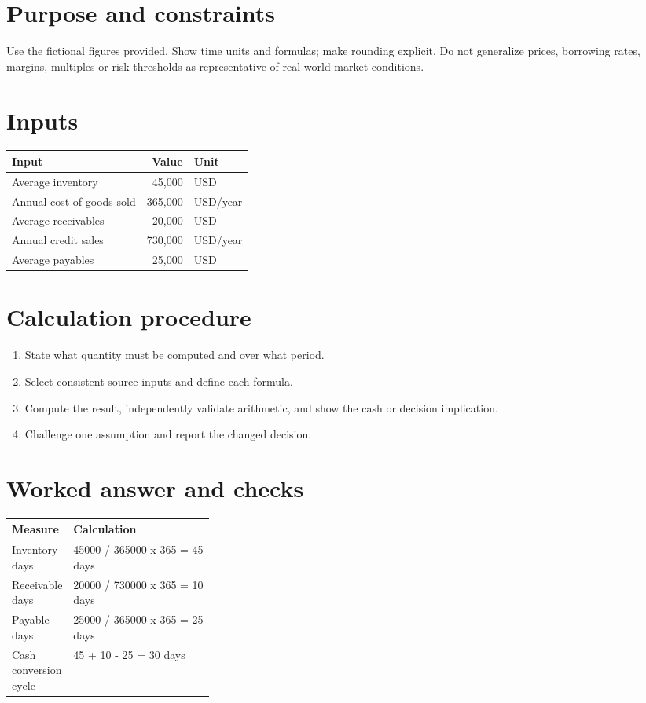 \documentclass[11pt]{article}
\begin{document}
\SuiteOpen
\section{Purpose and constraints}
Use the fictional figures provided. Show time units and formulas; make rounding explicit. Do not generalize prices, borrowing rates, margins, multiples or risk thresholds as representative of real-world market conditions.
\section{Inputs}
\begin{tabularx}{\linewidth}{@{}Y r l@{}}\toprule Input & Value & Unit\\\midrule
Average inventory & 45,000 & USD\\
Annual cost of goods sold & 365,000 & USD/year\\
Average receivables & 20,000 & USD\\
Annual credit sales & 730,000 & USD/year\\
Average payables & 25,000 & USD\\
\bottomrule\end{tabularx}
\section{Calculation procedure}
\begin{enumerate}[leftmargin=*,itemsep=5pt]
\item State what quantity must be computed and over what period.
\item Select consistent source inputs and define each formula.
\item Compute the result, independently validate arithmetic, and show the cash or decision implication.
\item Challenge one assumption and report the changed decision.
\end{enumerate}

\section{Worked answer and checks}
\begin{tabularx}{\linewidth}{@{}p{0.30\linewidth}Y@{}}\toprule Measure & Calculation\\\midrule
Inventory days & 45000 / 365000 x 365 = 45 days\\
Receivable days & 20000 / 730000 x 365 = 10 days\\
Payable days & 25000 / 365000 x 365 = 25 days\\
Cash conversion cycle & 45 + 10 - 25 = 30 days\\
\bottomrule\end{tabularx}
\end{document}
